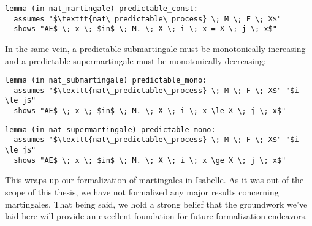 \begin{isalemma}
{\small
\begin{lstlisting}[style=isabelle]
lemma (in nat_martingale) predictable_const:
  assumes "$\texttt{nat\_predictable\_process} \; M \; F \; X$"
  shows "AE$ \; x \; $in$ \; M. \; X \; i \; x = X \; j \; x$"
\end{lstlisting}
}
\end{isalemma}

In the same vein, a predictable submartingale must be monotonically increasing and a predictable supermartingale must be monotonically decreasing:

\begin{isalemma}
{\small
\begin{lstlisting}[style=isabelle]
lemma (in nat_submartingale) predictable_mono:
  assumes "$\texttt{nat\_predictable\_process} \; M \; F \; X$" "$i \le j$"
  shows "AE$ \; x \; $in$ \; M. \; X \; i \; x \le X \; j \; x$"
\end{lstlisting}
}
\end{isalemma}

\begin{isalemma}
{\small
\begin{lstlisting}[style=isabelle]
lemma (in nat_supermartingale) predictable_mono:
  assumes "$\texttt{nat\_predictable\_process} \; M \; F \; X$" "$i \le j$"
  shows "AE$ \; x \; $in$ \; M. \; X \; i \; x \ge X \; j \; x$"
\end{lstlisting}
}
\end{isalemma}

This wraps up our formalization of martingales in Isabelle. As it was out of the scope of this thesis, we have not formalized any major results concerning martingales. That being said, we hold a strong belief that the groundwork we've laid here will provide an excellent foundation for future formalization endeavors.